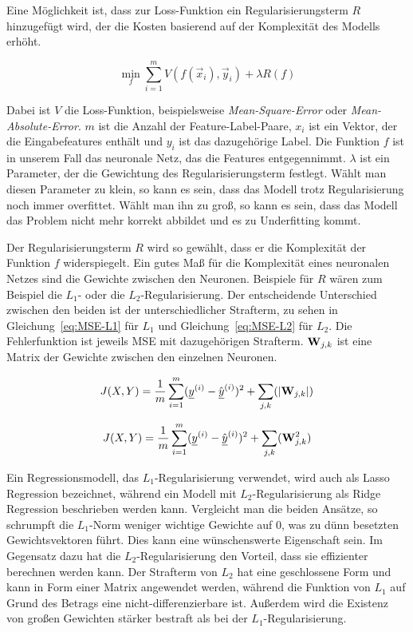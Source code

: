 Eine Möglichkeit ist, dass zur Loss-Funktion ein Regularisierungsterm \(R\) hinzugefügt wird, 
der die Kosten basierend auf der Komplexität des Modells erhöht.
 
\begin{equation}
	\min_f \sum\limits_{i=1}^{m} V(f(\vec{x}_i), \vec{y}_i) + \lambda R(f)
\end{equation} 
 
Dabei ist \(V\) die Loss-Funktion, beispielsweise \textit{Mean-Square-Error} oder \textit{Mean-Absolute-Error}.
\(m\) ist die Anzahl der Feature-Label-Paare,
\(x_i\) ist ein Vektor, der die Eingabefeatures enthält und \(y_i\) ist das dazugehörige Label.
Die Funktion \(f\) ist in unserem Fall das neuronale Netz, das die Features entgegennimmt.
\(\lambda\) ist ein Parameter, der die Gewichtung des Regularisierungsterm festlegt.
Wählt man diesen Parameter zu klein, so kann es sein, dass das Modell trotz Regularisierung noch immer overfittet.
Wählt man ihn zu groß, so kann es sein, dass das Modell das Problem nicht mehr korrekt abbildet und es zu Underfitting kommt.

Der Regularisierungsterm \(R\) wird so gewählt, dass er die Komplexität der Funktion \(f\) widerspiegelt.
Ein gutes Maß für die Komplexität eines neuronalen Netzes sind die Gewichte zwischen den Neuronen.
Beispiele für \(R\) wären zum Beispiel die \(L_1\)- oder die \(L_2\)-Regularisierung. %
Der entscheidende Unterschied zwischen den beiden ist der unterschiedlicher Strafterm, zu sehen in Gleichung~\eqref{eq:MSE-L1} für \(L_1\) und Gleichung~\eqref{eq:MSE-L2} für \(L_2\). 
Die Fehlerfunktion ist jeweils MSE mit dazugehörigen Strafterm. \({{\mathbf{W}}}_{j,k}\) ist eine Matrix der Gewichte zwischen den einzelnen Neuronen. 

\begin{equation} \label{eq:MSE-L1}
	J(X, Y) = \frac{1}{m} \sum_{i=1}^{m} ({\underline{y}}^{(i)} - \hat{{\underline{y}}}^{(i)})^2 + \sum_{j, k} (|{{\mathbf{W}}}_{j,k}|)
\end{equation} 

\begin{equation} \label{eq:MSE-L2}
	J(X, Y) = \frac{1}{m} \sum_{i=1}^{m} ({\underline{y}}^{(i)} - \hat{{\underline{y}}}^{(i)})^2 + \sum_{j, k} ({{\mathbf{W}}}_{j,k}^2)
\end{equation} 


Ein Regressionsmodell, das \(L_1\)-Regularisierung verwendet, wird auch als Lasso Regression bezeichnet, 
während ein Modell mit \(L_2\)-Regularisierung als Ridge Regression beschrieben werden kann.
Vergleicht man die beiden Ansätze, so schrumpft die \(L_1\)-Norm weniger wichtige Gewichte auf 0, was zu dünn besetzten Gewichtsvektoren führt.
Dies kann eine wünschenswerte Eigenschaft sein.
Im Gegensatz dazu hat die \(L_2\)-Regularisierung den Vorteil, dass sie effizienter berechnen werden kann.
Der Strafterm von \(L_2\) hat eine geschlossene Form und kann in Form einer Matrix angewendet werden, während die Funktion von \(L_1\) auf Grund des Betrags eine nicht-differenzierbare ist.
Außerdem wird die Existenz von großen Gewichten stärker bestraft als bei der \(L_1\)-Regularisierung.

